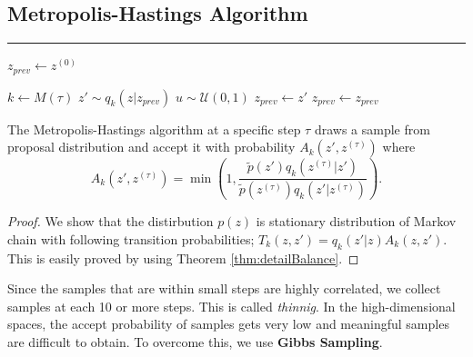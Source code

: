 \documentclass{article}
\begin{document}
    \subsection{Metropolis-Hastings Algorithm}
        \begin{algorithm}[H]
            \DontPrintSemicolon

            \caption{Metropolis-Hastings algorithm}


            \BlankLine
            \hrule

            $z_{prev} \leftarrow z^{(0)}$\;

            {
            $k \leftarrow M(\tau)$\;
            $z' \sim q_k(z|z_{prev})$\;
            $u \sim \mathcal{U}(0,1)$\;
            {
                $z_{prev} \leftarrow z'$
            }
            {
                $z_{prev} \leftarrow z_{prev}$
            }
            }
        \end{algorithm}
        The Metropolis-Hastings algorithm at a specific step $\tau$ draws a sample from proposal distribution and accept it with probability $A_k(z',z^{(\tau)})$
        where
        \[
        A_k(z', z^{(\tau)})=\min{\left(1, \frac{\tilde{p}(z')q_k(z^{(\tau)}|z')}{\tilde{p}(z^{(\tau)})q_k(z'|z^{(\tau)})} \right)}.
        \] 
        \begin{proof}
            We show that the distirbution $p(z)$ is stationary distribution of Markov chain with following transition probabilities;
            $T_k(z, z') = q_k(z'|z)A_k(z,z')$. This is easily proved by using Theorem \ref{thm:detailBalance}.
        \end{proof}

        Since the samples that are within small steps are highly correlated, we collect samples at each 10 or more steps. This is called \emph{thinnig}.
        In the high-dimensional spaces, the accept probability of samples gets very low and meaningful samples are difficult to obtain.
        To overcome this, we use \textbf{Gibbs Sampling}.
\end{document}
